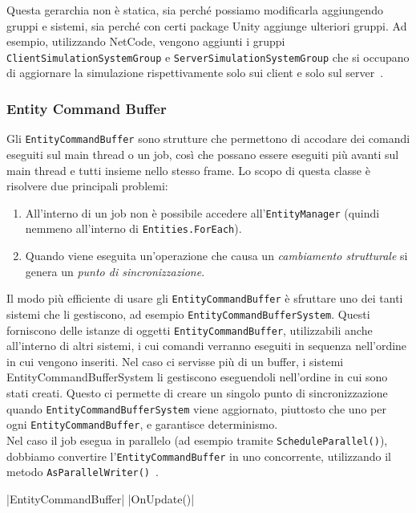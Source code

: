 Questa gerarchia non è statica, sia perché possiamo modificarla aggiungendo gruppi e sistemi, sia perché con certi package Unity aggiunge ulteriori gruppi. Ad esempio, utilizzando NetCode, vengono aggiunti i gruppi \verb|ClientSimulationSystemGroup| e \verb|ServerSimulationSystemGroup| che si occupano di aggiornare la simulazione rispettivamente solo sui client e solo sul server~\cite{article:player-loop-groups, doc:unity-entities-manual}.

\subsubsection{Entity Command Buffer}
Gli \verb|EntityCommandBuffer| sono strutture che permettono di accodare dei comandi eseguiti sul main thread o un job, così che possano essere eseguiti più avanti sul main thread e tutti insieme nello stesso frame.
Lo scopo di questa classe è risolvere due principali problemi: 
\begin{enumerate}
    \item All'interno di un job non è possibile accedere all'\verb|EntityManager| (quindi nemmeno all'interno di \verb|Entities.ForEach|).
    \item Quando viene eseguita un'operazione che causa un \emph{cambiamento strutturale} si genera un \emph{punto di sincronizzazione}.
\end{enumerate}

Il modo più efficiente di usare gli \verb|EntityCommandBuffer| è sfruttare uno dei tanti sistemi che li gestiscono, ad esempio \verb|EntityCommandBufferSystem|. Questi forniscono delle istanze di oggetti \verb|EntityCommandBuffer|, utilizzabili anche all'interno di altri sistemi, i cui comandi verranno eseguiti in sequenza nell'ordine in cui vengono inseriti. Nel caso ci servisse più di un buffer, i sistemi EntityCommandBufferSystem li gestiscono eseguendoli nell'ordine in cui sono stati creati.
Questo ci permette di creare un singolo punto di sincronizzazione quando \verb|EntityCommandBufferSystem| viene aggiornato, piuttosto che uno per ogni \verb|EntityCommandBuffer|, e garantisce determinismo.\\
Nel caso il job esegua in parallelo (ad esempio tramite \verb|ScheduleParallel()|), dobbiamo convertire l'\verb|EntityCommandBuffer| in uno concorrente, utilizzando il metodo \verb|AsParallelWriter()|~\cite{doc:unity-entities-api}.

|EntityCommandBuffer|
|OnUpdate()|

